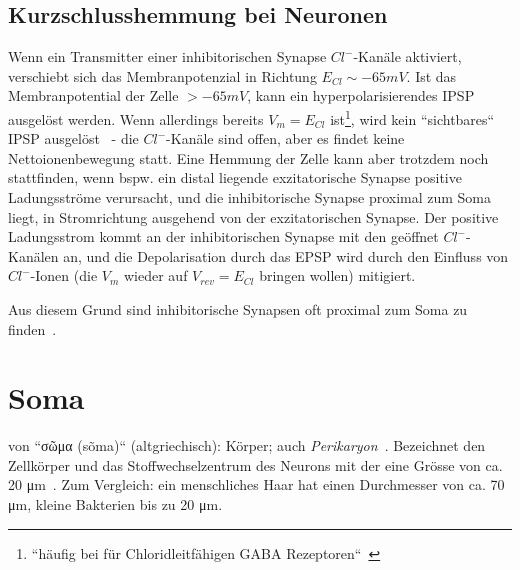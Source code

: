\subsection*{Kurzschlusshemmung bei Neuronen}
Wenn ein Transmitter einer inhibitorischen Synapse $Cl^-$-Kanäle aktiviert, verschiebt sich das Membranpotenzial in Richtung $E_{Cl} \sim -65 mV$.
Ist das Membranpotential der Zelle $> -65 mV$, kann ein hyperpolarisierendes IPSP ausgelöst werden.
Wenn allerdings bereits $V_m = E_{Cl}$ ist\footnote{
    ``häufig bei für Chloridleitfähigen GABA Rezeptoren``~\cite[100]{HS19a}
}, wird kein ``sichtbares`` IPSP ausgelöst~\cite[145 f.]{BCP18} - die $Cl^-$-Kanäle sind offen, aber es findet keine Nettoionenbewegung statt.
Eine Hemmung der Zelle kann aber trotzdem noch stattfinden, wenn bspw. ein distal liegende exzitatorische Synapse positive Ladungsströme verursacht, und die inhibitorische Synapse proximal zum Soma liegt, in Stromrichtung ausgehend von der exzitatorischen Synapse.
Der positive Ladungsstrom kommt an der inhibitorischen Synapse mit den geöffnet $Cl^-$-Kanälen an, und die Depolarisation durch das EPSP wird durch den Einfluss von $Cl^-$-Ionen (die $V_m$ wieder auf $V_{rev} = E_{Cl}$ bringen wollen) mitigiert.

Aus diesem Grund sind inhibitorische Synapsen oft proximal zum Soma zu finden~\cite[231]{KSJ+13}.


\section{Soma}\label{appendix:soma}
von ``\textgreek{σῶμα} (sõma)`` (altgriechisch): Körper; auch \textit{Perikaryon}~\cite[58]{RK18}.
Bezeichnet den Zellkörper und das Stoffwechselzentrum des Neurons mit der eine Grösse von ca. 20 μm~\cite[29]{BCP18}.
Zum Vergleich: ein menschliches Haar hat einen Durchmesser von ca. 70 μm, kleine Bakterien bis zu 20 μm.
